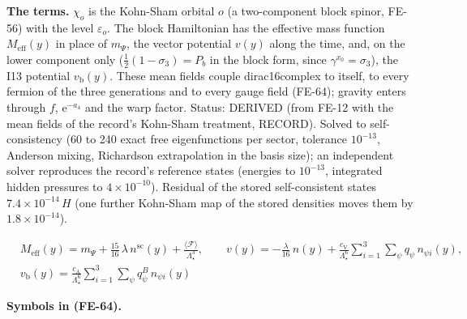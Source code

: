 \documentclass[
  10pt,
]{article}
\begin{document}
\textbf{The terms.} \(\chi_o\) is the Kohn-Sham orbital \(o\) (a
two-component block spinor, FE-56) with the level \(\varepsilon_o\). The
block Hamiltonian has the effective mass function
\(M_{\mathrm{eff}}(y)\) in place of \(m_\Psi\), the vector potential
\(v(y)\) along the time, and, on the lower component only
(\(\frac12(1 - \sigma_3) = P_b\) in the block form, since
\(\gamma^{x_0} = \sigma_3\)), the I13 potential \(v_{\mathrm{b}}(y)\).
These mean fields couple dirac16complex to itself, to every fermion of
the three generations and to every gauge field (FE-64); gravity enters
through \(f\), \(\mathrm{e}^{-a_4}\) and the warp factor. Status:
DERIVED (from FE-12 with the mean fields of the record's Kohn-Sham
treatment, RECORD). Solved to self-consistency (60 to 240 exact free
eigenfunctions per sector, tolerance \(10^{-13}\), Anderson mixing,
Richardson extrapolation in the basis size); an independent solver
reproduces the record's reference states (energies to \(10^{-13}\),
integrated hidden pressures to \(4\times10^{-10}\)). Residual of the
stored self-consistent states \(7.4\times10^{-14}\,H\) (one further
Kohn-Sham map of the stored densities moves them by
\(1.8\times10^{-14}\)).

\[
\begin{aligned}
&M_{\mathrm{eff}}(y) = m_\Psi + \frac{15}{16}\,\lambda\,n^{\mathrm{sc}}(y) +
 \frac{\langle\mathcal{F}\rangle}{\Lambda_\star^3},\qquad
 v(y) = -\frac{\lambda}{16}\,n(y) + \frac{c_{\mathrm{V}}}{\Lambda_\star^6}\sum_{i=1}^{3}\sum_\psi
 q_\psi\,n_{\psi i}(y),\\
&v_{\mathrm{b}}(y) = \frac{c_{\mathrm{A}}}{\Lambda_\star^6}\sum_{i=1}^{3}\sum_\psi q^{B}_\psi\,n_{\psi i}(y)
\end{aligned} \tag{FE-64}
\]

\textbf{Symbols in (FE-64).}
\end{document}

